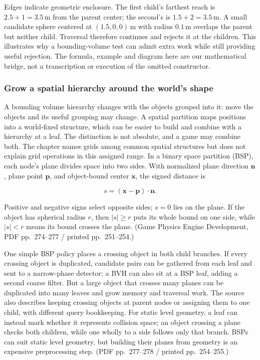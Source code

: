 
Edges indicate geometric enclosure. The first child's farthest reach is \(2.5+1=3.5\,\mathrm m\) from the parent center; the second's is \(1.5+2=3.5\,\mathrm m\). A small candidate sphere centered at \((1.5,0,0)\,\mathrm m\) with radius \(0.1\,\mathrm m\) overlaps the parent but neither child. Traversal therefore continues and rejects it at the children. This illustrates why a bounding-volume test can admit extra work while still providing useful rejection. The formula, example and diagram here are our mathematical bridge, not a transcription or execution of the omitted constructor.

\subsubsection{Grow a spatial hierarchy around the world's shape}\label{06-engine-ii-ch033-grow-a-spatial-hierarchy-around-the-worlds-shape}

\hypertarget{06-engine-ii-ch033-grow-a-spatial-hierarchy-around-the-worlds-shape}{}

A bounding volume hierarchy changes with the objects grouped into it: move the objects and its useful grouping may change. A spatial partition maps positions into a world-fixed structure, which can be easier to build and combine with a hierarchy at a leaf. The distinction is not absolute, and a game may combine both. The chapter names grids among common spatial structures but does not explain grid operations in this assigned range. In a binary space partition (BSP), each node's plane divides space into two sides. With normalized plane direction \(\mathbf{n}\), plane point \(\mathbf{p}\), and object-bound center \(\mathbf{x}\), the signed distance is

\[
s=(\mathbf{x}-\mathbf{p})\cdot\mathbf{n}.
\]

Positive and negative signs select opposite sides; \(s=0\) lies on the plane. If the object has spherical radius \(r\), then \(|s|\geq r\) puts its whole bound on one side, while \(|s|<r\) means its bound crosses the plane. (Game Physics Engine Development, PDF pp.~274--277 / printed pp.~251--254.)

One simple BSP policy places a crossing object in both child branches. If every crossing object is duplicated, candidate pairs can be gathered from each leaf and sent to a narrow-phase detector; a BVH can also sit at a BSP leaf, adding a second coarse filter. But a large object that crosses many planes can be duplicated into many leaves and grow memory and traversal work. The source also describes keeping crossing objects at parent nodes or assigning them to one child, with different query bookkeeping. For static level geometry, a leaf can instead mark whether it represents collision space; an object crossing a plane checks both children, while one wholly to a side follows only that branch. BSPs can suit static level geometry, but building their planes from geometry is an expensive preprocessing step. (PDF pp.~277--278 / printed pp.~254--255.)

